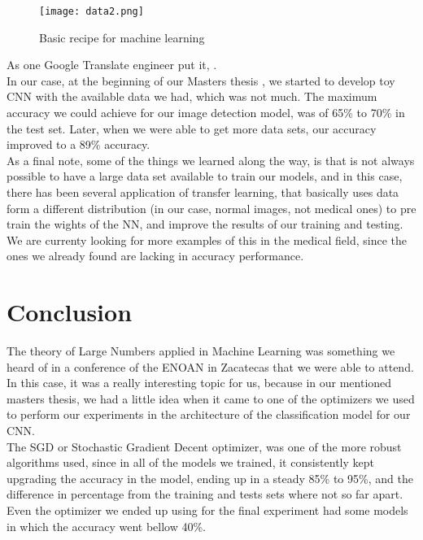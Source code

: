 \documentclass{article}
\begin{document}
\begin{figure}[]
  \centering
  \texttt{[image: data2.png]}  
	\caption{Basic recipe for machine learning \cite{ng2017machine}}
\label{fig4}
\end{figure}


As one Google Translate engineer put it, . \\

In our case, at the beginning of our Masters thesis \cite{tesis}, we started to develop toy CNN with the available data we had, which was not much. The maximum accuracy we could achieve for our image detection model, was of 65\% to 70\% in the test set. Later, when we were able to get more data sets, our accuracy improved to a 89\% accuracy.\\

As a final note, some of the things we learned along the way, is that is not always possible to have a large data set available to train our models, and in this case, there has been several application of transfer learning, that basically uses data form a different distribution (in our case, normal images, not medical ones) to pre train the wights of the NN, and improve the results of our training and testing. We are currenty looking for more examples of this in the medical field, since the ones we already found are lacking in accuracy performance.\\

\section{Conclusion}

The theory of Large Numbers applied in Machine Learning was something we heard of in a conference of the ENOAN in Zacatecas that we were able to attend. In this case, it was a really interesting topic for us, because in our mentioned masters thesis, we had a little idea when it came to one of the optimizers we used to perform our experiments in the architecture of the classification model for our CNN. \\

The SGD or Stochastic Gradient Decent optimizer, was one of the more robust algorithms used, since in all of the models we trained, it consistently kept upgrading the accuracy in the model, ending up in a steady 85\% to 95\%, and the difference in percentage from the training and tests sets where not so far apart. Even the optimizer we ended up using for the final experiment had some models in which the accuracy went bellow 40\%.\\
\end{document}
